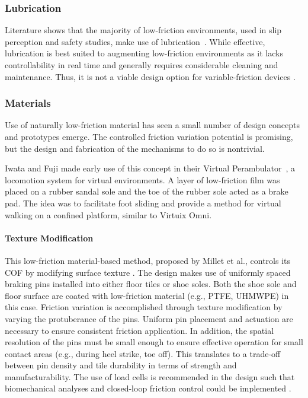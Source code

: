 \documentclass [12pt,letterpaper]{report}
\begin{document}
\subsubsection{Lubrication}

Literature shows that the majority of low-friction environments, used in slip perception and safety studies, make use of lubrication~\cite{gronqvist1993slipperiness,hanson1999predicting,li2004floor,fong2009human}. While effective, lubrication is best suited to augmenting low-friction environments as it lacks controllability in real time and generally requires considerable cleaning and maintenance. Thus, it is not a viable design option for variable-friction devices \cite{millet2013vibration}.

\subsubsection{Materials}
\label{mats}

Use of naturally low-friction material has seen a small number of design concepts and prototypes emerge. The controlled friction variation potential is promising, but the design and fabrication of the mechanisms to do so is nontrivial.

Iwata and Fuji made early use of this concept in their Virtual Perambulator~\cite{iwata1996virtual}, a locomotion system for virtual environments. A layer of low-friction film was placed on a rubber sandal sole and the toe of the rubber sole acted as a brake pad. The idea was to facilitate foot sliding and provide a method for virtual walking on a confined platform, similar to Virtuix Omni.

\paragraph{Texture Modification}
\label{pins}

This low-friction material-based method, proposed by Millet et al., controls its COF by modifying surface texture \cite{millet2016design}. The design makes use of uniformly spaced braking pins installed into either floor tiles or shoe soles. Both the shoe sole and floor surface are coated with low-friction material (e.g., PTFE, UHMWPE) in this case. Friction variation is accomplished through texture modification by varying the protuberance of the pins. Uniform pin placement and actuation are necessary to ensure consistent friction application. In addition, the spatial resolution of the pins must be small enough to ensure effective operation for small contact areas (e.g., during heel strike, toe off). This translates to a trade-off between pin density and tile durability in terms of strength and manufacturability. The use of load cells is recommended in the design such that biomechanical analyses and closed-loop friction control could be implemented \cite{millet2016design}.
\end{document}
